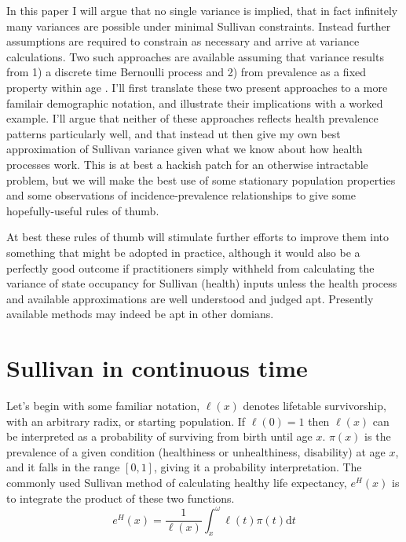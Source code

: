 \documentclass{bmcart}
\begin{document}
In this paper I will argue that no single variance is implied, that in fact infinitely many variances are possible under minimal Sullivan constraints. Instead further assumptions are required to constrain as necessary and arrive at variance calculations. Two such approaches are available assuming that variance results from 1) a discrete time Bernoulli process and 2) from prevalence as a fixed property within age \citep{caswell2018matrix}. I'll first translate these two present approaches to a more familair demographic notation, and illustrate their implications with a worked example. I'll argue that neither of these approaches reflects health prevalence patterns particularly well, and that instead ut then give my own best approximation of Sullivan variance given what we know about how health processes work. This is at best a hackish patch for an otherwise intractable problem, but we will make the best use of some stationary population properties and some observations of incidence-prevalence relationships to give some hopefully-useful rules of thumb. 

At best these rules of thumb will stimulate further efforts to improve them into something that might be adopted in practice, although it would also be a perfectly good outcome if practitioners simply withheld from calculating the variance of state occupancy for Sullivan (health) inputs unless the health process and available approximations are well understood and judged apt. Presently available methods may indeed be apt in other domians.



\section*{Sullivan in continuous time}
Let's begin with some familiar notation, $\ell(x)$ denotes lifetable survivorship, with an arbitrary radix, or starting population. If $\ell(0) = 1$ then $\ell(x)$ can be interpreted as a probability of surviving from birth until age $x$. $\pi(x)$ is the prevalence of a given condition (healthiness or unhealthiness, disability) at age $x$, and it falls in the range $[0,1]$, giving it a probability interpretation. The commonly used Sullivan method \citep{sullivan1971single} of calculating healthy life expectancy, $e^H(x)$ is to integrate the product of these two functions.
%
\begin{equation}
\label{eq:sull}
e^H(x) = \frac{1}{\ell(x)} \int_x^\omega \ell(t)\pi(t) \mathrm{d}t
\end{equation}
%
\end{document}
